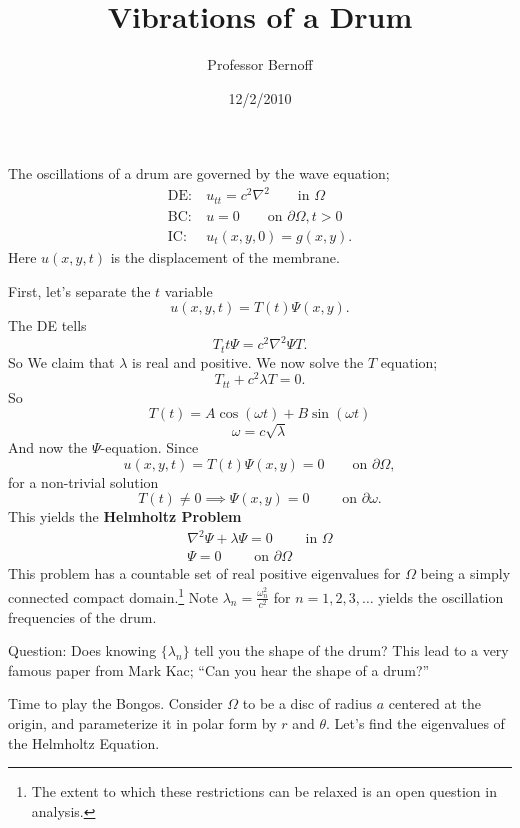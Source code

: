 \documentclass[cm]{article}
\title{Vibrations of a Drum}
\author{Professor Bernoff}
\date{12/2/2010}
\begin{document}
\maketitle
The oscillations of a drum are governed by the wave equation;
\begin{align*}
    \text{DE:}&~ u_{tt} = c^2 \nabla^2 \qquad \text{in } \Omega\\
    \text{BC:}&~ u= 0 \qquad \text{on } \partial \Omega, t > 0 \\
    \text{IC:}&~ u_t(x,y,0) = g(x,y).
\end{align*}
Here $u(x,y,t)$ is the displacement of the membrane.

First, let's separate the $t$ variable
    $$u(x,y,t) = T(t) \Psi(x,y).$$
The DE tells
    $$T_tt \Psi = c^2 \nabla^2 \Psi T.$$
So
We claim that $\lambda$ is real and positive. We now solve the $T$ equation;
    $$T_{tt} + c^2 \lambda T = 0.$$
So
    $$T(t) = A \cos(\omega t) + B \sin(\omega t)$$
    $$ \omega = c \sqrt{\lambda}$$
And now the $\Psi$-equation. Since
    $$u(x,y,t) = T(t) \Psi(x,y) = 0 \qquad \text{on } \partial \Omega,$$
for a non-trivial solution
    $$T(t) \neq 0 \implies \Psi(x,y) = 0 \qquad \text{ on } \partial \omega.$$
This yields the {\bf Helmholtz Problem}
    \begin{align*}
    \nabla^2 \Psi + \lambda \Psi = 0 \qquad \text{ in } \Omega \\
    \Psi = 0 \qquad \text{ on } \partial \Omega
    \end{align*}
This problem has a countable set of real positive eigenvalues for $\Omega$ being
a simply connected compact domain.\footnote{The extent to which these
restrictions can be relaxed is an open question in analysis.} Note $\lambda_n =
\frac{\omega_n^2}{c^2}$ for $n = 1, 2, 3, \ldots$ yields the oscillation
frequencies of the drum.

Question: Does knowing $\{\lambda_n\}$ tell you the shape of the drum? This lead
to a very famous paper from Mark Kac; ``Can you hear the shape of a drum?''

Time to play the Bongos. Consider $\Omega$ to be a disc of radius $a$ centered
at the origin, and parameterize it in polar form by $r$ and $\theta$. Let's find
the eigenvalues of the Helmholtz Equation.
\end{document}
